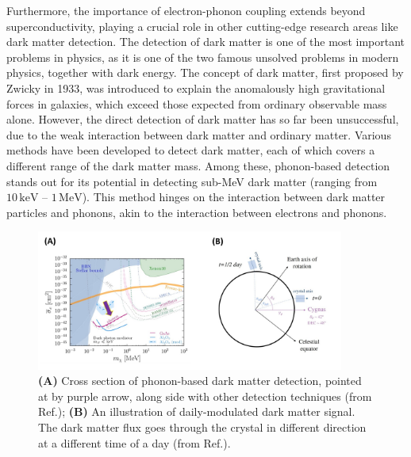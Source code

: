 \documentclass[11pt]{article}
\begin{document}
Furthermore, the importance of electron-phonon coupling extends beyond superconductivity, playing a crucial role in other cutting-edge research areas like dark matter detection. The detection of dark matter is one of the most important problems in physics, as it is one of the two famous unsolved problems in modern physics, together with dark energy. The concept of dark matter, first proposed by Zwicky in 1933\cite{andernach_english_2017}, was introduced to explain the anomalously high gravitational forces in galaxies, which exceed those expected from ordinary observable mass alone. However, the direct detection of dark matter has so far been unsuccessful, due to the weak interaction between dark matter and ordinary matter. Various methods have been developed to detect dark matter\cite{bergstrom_non-baryonic_2000}, each of which covers a different range of the dark matter mass\cite{vogel_dark_2014,essig_first_2012,davidson_updated_2000}. Among these, phonon-based detection stands out for its potential in detecting sub-MeV dark matter (ranging from $ 10\,\mathrm{keV}$ -- $1\,\mathrm{MeV}$). This method hinges on the interaction between dark matter particles and phonons, akin to the interaction between electrons and phonons\cite{griffin_directional_2018}. 

\begin{figure}
    \centering
    \includegraphics[width=0.9\textwidth]{figures/third_figure.jpg}
    \caption{\textbf{(A)} Cross section of phonon-based dark matter detection, pointed at by purple arrow, along side with other detection techniques (from Ref.\cite{griffin_directional_2018}); \textbf{(B)} An illustration of daily-modulated dark matter signal. The dark matter flux goes through the crystal in different direction at a different time of a day (from Ref.\cite{griffin_directional_2018}).}
    \label{third_figure}
\end{figure}
\end{document}
